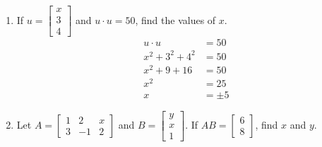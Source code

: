     \begin{example}
        \mbox{}

        \begin{enumerate}
            \item If \(u = \begin{bmatrix}
                x \\ 3 \\ 4
            \end{bmatrix}\) and \(u \cdot u = 50\), find the values of \(x\).
            \begin{align*}
                u \cdot u &= 50 \\
                x^2 + 3^2 + 4^2 &= 50 \\
                x^2 + 9 + 16 &= 50 \\
                x^2 &= 25 \\
                x &= \pm 5
            \end{align*}

            \item Let \(A = \begin{bmatrix}
                1 & 2 & x \\ 3 & -1 & 2
            \end{bmatrix}\) and \(B = \begin{bmatrix}
                y \\ x \\ 1
            \end{bmatrix}\). If \(AB = \begin{bmatrix}
                6 \\ 8
            \end{bmatrix}\), find \(x\) and \(y\).


\end{enumerate}
\end{example}
